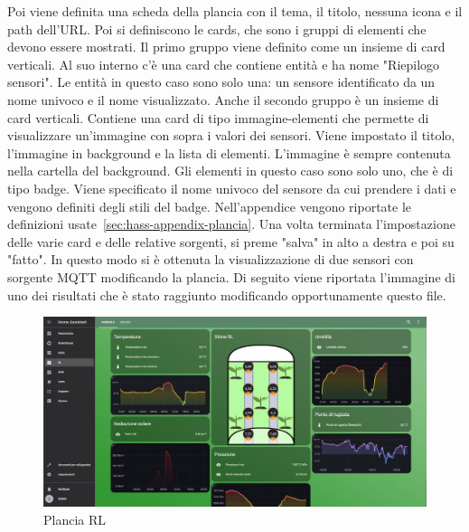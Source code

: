 Poi viene definita una scheda della plancia con il tema, il titolo, nessuna icona e il path dell'URL.
Poi si definiscono le cards, che sono i gruppi di elementi che devono essere mostrati.
Il primo gruppo viene definito come un insieme di card verticali.
Al suo interno c'è una card che contiene entità e ha nome "Riepilogo sensori".
Le entità in questo caso sono solo una: un sensore identificato da un nome univoco e il nome visualizzato.
Anche il secondo gruppo è un insieme di card verticali.
Contiene una card di tipo immagine-elementi che permette di visualizzare un'immagine 
con sopra i valori dei sensori.
Viene impostato il titolo, l'immagine in background e la lista di elementi.
L'immagine è sempre contenuta nella cartella del background.
Gli elementi in questo caso sono solo uno, che è di tipo badge.
Viene specificato il nome univoco del sensore da cui prendere i dati
e vengono definiti degli stili del badge.
Nell'appendice vengono riportate le definizioni usate~\ref{sec:hass-appendix-plancia}.
Una volta terminata l'impostazione delle varie card e delle relative sorgenti, 
si preme "salva" in alto a destra e poi su "fatto".
In questo modo si è ottenuta la visualizzazione di due sensori con sorgente MQTT modificando la plancia.\newline
Di seguito viene riportata l'immagine di uno dei risultati che è stato raggiunto 
modificando opportunamente questo file.

\begin{figure}[htp]
    \centering
    \includegraphics[width=1\linewidth]{images/chapter5-hass-visualizzazione.jpg}
    \caption{Plancia RL}
\end{figure}